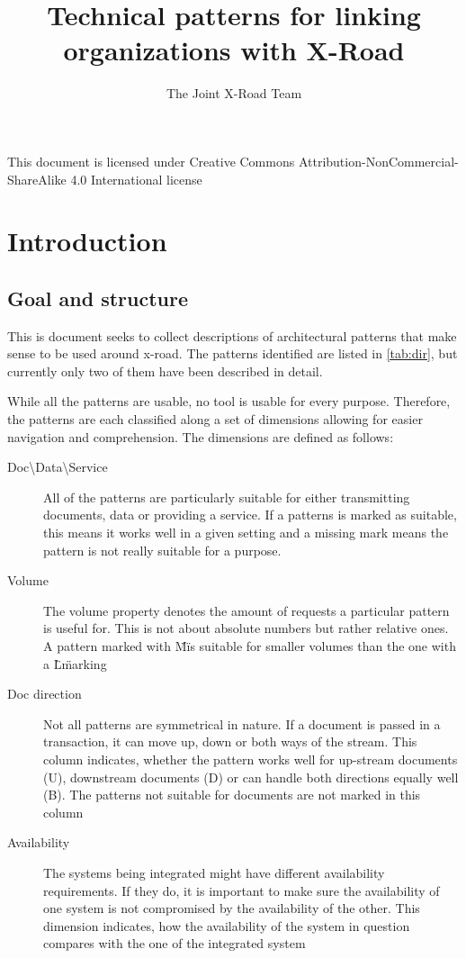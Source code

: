 \documentclass[10pt,a4paper]{article}
\title{Technical patterns for linking organizations with X-Road}
\author{The Joint X-Road Team}
\begin{document}
\maketitle
\clearpage
\setcounter{tocdepth}{2}
\tableofcontents
\clearpage
\thispagestyle{empty}
\null
\vfill

\begin{center}
This document is licensed under Creative Commons Attribution-NonCommercial-ShareAlike 4.0 International license\\[5mm]

\ccbyncsa\end{center}
\clearpage

\setcounter{section}{0}
\section{Introduction}
\subsection{Goal and structure}
This is document seeks to collect descriptions of architectural patterns that make sense to be used around x-road. The patterns identified are listed in \ref{tab:dir}, but currently only two of them have been described in detail.

While all the patterns are usable, no tool is usable for every purpose. Therefore, the patterns are each classified along a set of dimensions allowing for easier navigation and comprehension. The dimensions are defined as follows:
\begin{description}
	\item[Doc\textbackslash Data\textbackslash Service] All of the patterns are particularly suitable for either transmitting documents, data or providing a service. If a patterns is marked as suitable, this means it works well in a given setting and a missing mark means the pattern is not really suitable for a purpose. 
	\item[Volume] The volume property denotes the amount of requests a particular pattern is useful for. This is not about absolute numbers but rather relative ones. A pattern marked with \"M\" is suitable for smaller volumes than the one with a \"L\" marking
	\item[Doc direction] Not all patterns are symmetrical in nature. If a document is passed in a transaction, it can move up, down or both ways of the stream. This column indicates, whether the pattern works well for up-stream documents (U), downstream documents (D) or can handle both directions equally well (B). The patterns not suitable for documents are not marked in this column
	 \item[Availability] The systems being integrated might have different availability requirements. If they do, it is important to make sure the availability of one system is not compromised by the availability of the other. This dimension indicates, how the availability of the system in question compares with the one of the integrated system
\end{description}
\end{document}
